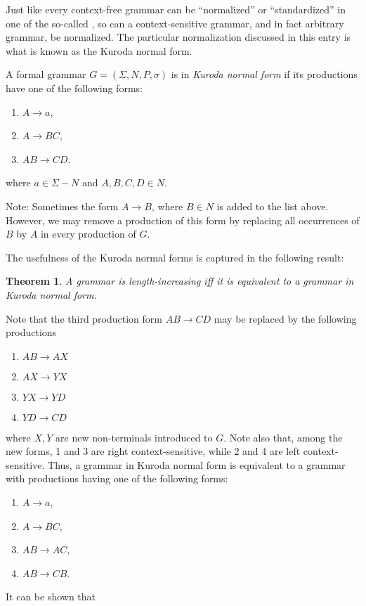\documentclass[12pt]{article}
\newtheorem{thm}{Theorem}
\begin{document}
Just like every context-free grammar can be ``normalized'' or ``standardized'' in one of the so-called , so can a context-sensitive grammar, and in fact arbitrary grammar, be normalized.  The particular normalization discussed in this entry is what is known as the Kuroda normal form.

A formal grammar $G=(\Sigma,N,P,\sigma)$ is in \emph{Kuroda normal form} if its productions have one of the following forms:
\begin{enumerate}
\item $A\to a$, 
\item $A\to BC$, 
\item $AB\to CD$.
\end{enumerate}
where $a\in \Sigma-N$ and $A,B,C,D\in N$.

Note: Sometimes the form $A\to B$, where $B\in N$ is added to the list above.  However, we may remove a production of this form by replacing all occurrences of $B$ by $A$ in every production of $G$.  

The usefulness of the Kuroda normal forms is captured in the following result:

\begin{thm} A grammar is length-increasing iff it is equivalent to a grammar in Kuroda normal form. \end{thm}

Note that the third production form $AB\to CD$ may be replaced by the following productions 
\begin{multicols}{2}{
\begin{enumerate}
\item $AB\to AX$ \\ [-3ex]
\item $AX\to YX$ \\ [-3ex]

\item $YX\to YD$ \\ [-3ex]
\item $YD\to CD$ \\ [-3ex]
\end{enumerate}}
\end{multicols}
where $X,Y$ are new non-terminals introduced to $G$.  Note also that, among the new forms, 1 and 3 are right context-sensitive, while 2 and 4 are left context-sensitive.  Thus, a grammar in Kuroda normal form is equivalent to a grammar with productions having one of the following forms:
\begin{enumerate}
\item $A\to a$,
\item $A\to BC$,
\item $AB\to AC$,
\item $AB\to CB$.
\end{enumerate}
It can be shown that
\end{document}

